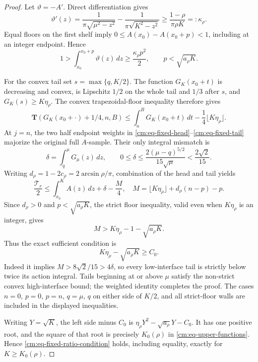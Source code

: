 \documentclass[11pt]{article}
\numberwithin{equation}{section}
\theoremstyle{definition}
\theoremstyle{remark}
\begin{document}
\begin{proof}
Let \(\vartheta=-A'\).  Direct differentiation gives
\[
 \vartheta'(z)=\frac1{\pi\sqrt{\mu^2-z^2}}
 -\frac1{\pi\sqrt{K^2-z^2}}
 \geq\frac{1-\rho}{\pi\rho K}=:\kappa_\rho.
\]
Equal floors on the first shelf imply
\(0\leq A(x_0)-A(x_0+p)<1\), including at an integer endpoint.  Hence
\[
 1>\int_{x_0}^{x_0+p}\vartheta(z)\,dz
 \geq\frac{\kappa_\rho p^2}{2},
 \qquad p<\sqrt{a_\rho K}.
\]

For the convex tail set \(s=\max\{q,K/2\}\).  The function
\(G_K(x_0+t)\) is decreasing and convex, is Lipschitz \(1/2\) on the
whole tail and \(1/3\) after \(s\), and
\(G_K(s)\geq K\eta_\rho\).  The convex trapezoidal-floor inequality
therefore gives
\begin{equation}
 \mathbf T(G_K(x_0+\cdot)+1/4,n,B)
 \leq\int_n^B G_K(x_0+t)\,dt
 -\frac14\lfloor K\eta_\rho\rfloor.
 \label{cm:eq-fixed-tail}
\end{equation}
At \(j=n\), the two half endpoint weights in
\eqref{cm:eq-fixed-head}--\eqref{cm:eq-fixed-tail} majorize the original
full \(A\)-sample.  Their only integral mismatch is
\[
 \delta=\int_q^\mu G_\mu(z)\,dz,
 \qquad 0\leq\delta\leq
 \frac{2(\mu-q)^{5/2}}{15\sqrt\mu}<\frac{2\sqrt2}{15}.
\]
Writing \(d_\rho=1-2c_\rho=2\arcsin\rho/\pi\), combination of the
head and tail yields
\[
 \frac{\mathcal T_r}{2}
 \leq\int_{x_0}^KA(z)\,dz+\delta-\frac M4,
 \quad
 M=\lfloor K\eta_\rho\rfloor+d_\rho(n-p)-p.
\]
Since \(d_\rho>0\) and \(p<\sqrt{a_\rho K}\), the strict floor
inequality, valid even when \(K\eta_\rho\) is an integer, gives
\[
 M>K\eta_\rho-1-\sqrt{a_\rho K}.
\]
Thus the exact sufficient condition is
\begin{equation}
 K\eta_\rho-\sqrt{a_\rho K}\geq C_0.
 \label{cm:eq-fixed-ratio-condition}
\end{equation}
Indeed it implies \(M>8\sqrt2/15>4\delta\), so every low-interface tail
is strictly below twice its action integral.  Tails beginning at or above
\(\mu\) satisfy the non-strict convex high-interface bound; the weighted
identity completes the proof.  The cases \(n=0\), \(p=0\), \(p=n\),
\(q=\mu\), \(q\) on either side of \(K/2\), and all strict-floor walls
are included in the displayed inequalities.

Writing \(Y=\sqrt K\), the left side minus \(C_0\) is
\(\eta_\rho Y^2-\sqrt{a_\rho}Y-C_0\).  It has one positive root, and
the square of that root is precisely \(K_0(\rho)\) in
\eqref{cm:eq-upper-functions}.  Hence \eqref{cm:eq-fixed-ratio-condition}
holds, including equality, exactly for \(K\geq K_0(\rho)\).

\end{proof}
\end{document}
